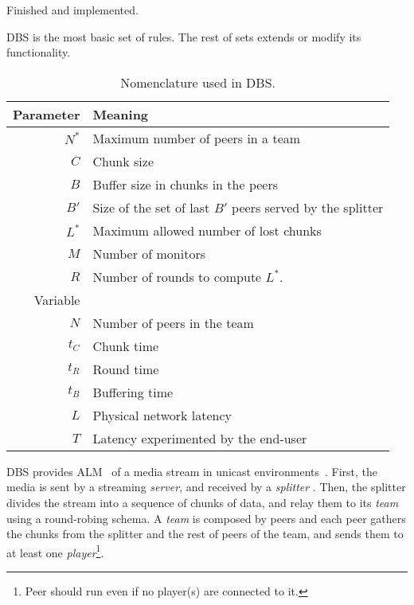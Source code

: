 

\label{sec:DBS}

\begin{note}
  Finished and implemented.
\end{note}

DBS is the most basic set of rules. The rest of sets extends or modify
its functionality.

\begin{table}
  \centering
  \begin{tabular}{rl}
    Parameter & Meaning \\
    \hline
    $N^*$  & Maximum number of peers in a team \\
    $C$    & Chunk size \\
    $B$    & Buffer size in chunks in the peers \\
    $B'$   & Size of the set of last $B'$ peers served by the splitter \\ 
    $L^*$  & Maximum allowed number of lost chunks \\
    $M$    & Number of monitors \\
    $R$    & Number of rounds to compute $L^*$. \\
    Variable & \\
    \hline
    $N$    & Number of peers in the team \\
    $t_C$  & Chunk time \\
    $t_R$  & Round time \\
    $t_B$  & Buffering time \\
    $L$    & Physical network latency \\
    $T$    & Latency experimented by the end-user
  \end{tabular}
  \caption{Nomenclature used in DBS.} %
  \label{tab:DBS_nomenclature}
\end{table}

\acrshort{DBS} provides ALM~\cite{banerjee2002scalable} of a media
stream in unicast environments~\cite{comer2003computer}. First, the
media is sent by a streaming \emph{server}, and received by a
\emph{splitter} . Then, the splitter
divides the stream into a sequence of chunks of data, and relay them
to its \emph{team} using a round-robing schema. A \emph{team} is
composed by peers and each peer gathers the chunks from the splitter
and the rest of peers of the team, and sends them to at least one
\emph{player}\footnote{Peer should run even if no player(s) are
  connected to it.}.

